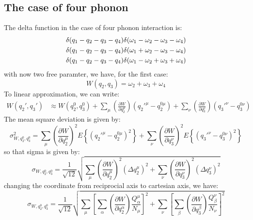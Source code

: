 \documentclass{article}
\newcommand{\pfrac}[2]{\frac{\partial #1}{\partial #2}}
\begin{document}
\subsection{The case of four phonon}
The delta function in the case of four phonon interaction is:
\begin{gather}
    \delta(q_1 - q_2 - q_3 - q_4)\delta(\omega_1 - \omega_2 - \omega_3 - \omega_4) \notag \\
    \delta(q_1 - q_2 - q_3 - q_4)\delta(\omega_1 + \omega_2 - \omega_3 - \omega_4) \notag \\
    \delta(q_1 - q_2 - q_3 - q_4)\delta(\omega_1 - \omega_2 + \omega_3 + \omega_4) \notag \\
\end{gather}
with now two free paramter, we have, for the first case:
\begin{equation}
    W(q_2, q_3) = \omega_2 + \omega_3 + \omega_4
\end{equation}
To linear approximation, we can write:
\begin{align}
    W(q_2',q_3') &\approx W(q_2^0,q_3^0) 
                + \sum_\mu \left( \pfrac{W}{q_2^{\mu}} \right) \left( q_2'^{\mu} - q_2^{0\mu}\right)
                + \sum_\nu \left( \pfrac{W}{q_3^{\nu}} \right) \left( q_3'^{\nu} - q_3^{0\nu}\right)
\end{align}
The mean square deviation is given by:
\begin{equation}
    \sigma^2_{W,q_2^0,q_3^0} = \sum_\mu \left( \pfrac{W}{q_2^{\mu}} \right)^2 E\left\{ \left( q_2'^{\mu} - q_2^{0\mu}\right)^2 \right\}
                             + \sum_\nu \left( \pfrac{W}{q_3^{\nu}} \right)^2 E\left\{ \left( q_3'^{\nu} - q_3^{0\nu}\right)^2 \right\}
\end{equation}
so that sigma is given by:
\begin{equation}
    \sigma_{W,q_2^0,q_3^0} = \frac{1}{\sqrt{12}} \sqrt{ \sum_\mu \left( \pfrac{W}{q_2^{\mu}} \right)^2 ( \Delta q_2^{\mu} )^2 
                                                      + \sum_\nu \left( \pfrac{W}{q_3^{\nu}} \right)^2 ( \Delta q_3^{\nu} )^2   } 
\end{equation}
changing the coordinate from reciprocial axis to cartesian axis, we have:
\begin{equation}
    \sigma_{W,q_2^0,q_3^0} = \frac{1}{\sqrt{12}} 
        \sqrt{ \sum_\mu \left[ \sum_{\alpha}\left( \pfrac{W}{q_2^{\alpha}} \right) \frac{Q_{\alpha}^{\mu}}{ N_{\mu}}  \right]^2 
             + \sum_\nu \left[ \sum_{\beta}\left( \pfrac{W}{q_3^{\beta}} \right) \frac{Q_{\beta}^{\nu}}{ N_{\nu}}  \right]^2  } 
\end{equation}
\end{document}
